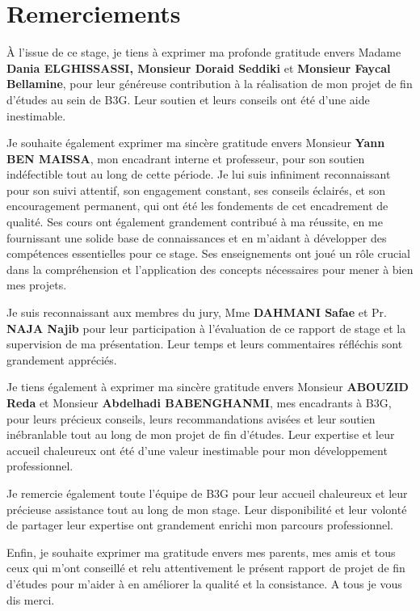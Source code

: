 \chapter*{Remerciements}

\hspace{\parindent} À l'issue de ce stage, je tiens à exprimer ma profonde gratitude envers Madame \textbf{Dania ELGHISSASSI, Monsieur Doraid Seddiki} et \textbf{Monsieur Faycal Bellamine}, pour leur généreuse contribution à la réalisation de mon projet de fin d'études au sein de B3G. Leur soutien et leurs conseils ont été d'une aide inestimable.

Je souhaite également exprimer ma sincère gratitude envers Monsieur \textbf{Yann BEN MAISSA}, mon encadrant interne et professeur, pour son soutien indéfectible tout au long de cette période. Je lui suis infiniment reconnaissant pour son suivi attentif, son engagement constant, ses conseils éclairés, et son encouragement permanent, qui ont été les fondements de cet encadrement de qualité. Ses cours ont également grandement contribué à ma réussite, en me fournissant une solide base de connaissances et en m'aidant à développer des compétences essentielles pour ce stage. Ses enseignements ont joué un rôle crucial dans la compréhension et l'application des concepts nécessaires pour mener à bien mes projets.

Je suis reconnaissant aux membres du jury, Mme \textbf{DAHMANI Safae} et Pr. \textbf{NAJA Najib} pour leur participation à l'évaluation de ce rapport de stage et la supervision de ma présentation. Leur temps et leurs commentaires réfléchis sont grandement appréciés.

Je tiens également à exprimer ma sincère gratitude envers Monsieur \textbf{ABOUZID Reda} et Monsieur \textbf{Abdelhadi BABENGHANMI}, mes encadrants à B3G, pour leurs précieux conseils, leurs recommandations avisées et leur soutien inébranlable tout au long de mon projet de fin d’études. Leur expertise et leur accueil chaleureux ont été d'une valeur inestimable pour mon développement professionnel.


Je remercie également toute l'équipe de B3G pour leur accueil chaleureux et leur précieuse assistance tout au long de mon stage. Leur disponibilité et leur volonté de partager leur expertise ont grandement enrichi mon parcours professionnel.

Enfin, je souhaite exprimer ma gratitude envers mes parents, mes amis et tous ceux qui m'ont conseillé et relu attentivement le présent rapport de projet de fin d’études pour m’aider à en améliorer la qualité et la consistance. A tous je vous dis merci.

